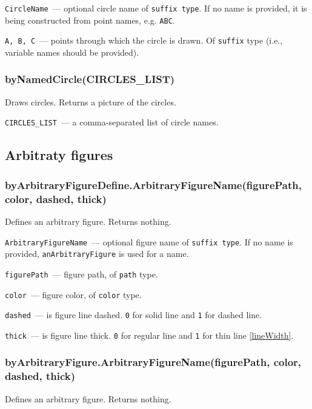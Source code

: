 	\texttt{CircleName}~— optional circle name of \texttt{suffix type}. If no name is provided, it is being constructed from point names, e.g. \texttt{ABC}.
	
	\texttt{A, B, C}~— points through which the circle is drawn. Of \texttt{suffix} type (i.e., variable names should be provided).


\subsubsection{byNamedCircle(CIRCLES\_LIST)}\label{byNamedCircle}
	
	Draws circles. Returns a picture of the circles.
	
	\texttt{CIRCLES\_LIST}~— a comma-separated list of circle names.

\subsection{Arbitraty figures}

\subsubsection{byArbitraryFigureDefine.ArbitraryFigureName(figurePath, color, dashed, thick)}\label{byArbitraryFigureDefine}
	
	Defines an arbitrary figure. Returns nothing.
	
	\texttt{ArbitraryFigureName}~— optional figure name of \texttt{suffix type}. If no name is provided, \texttt{anArbitraryFigure} is used for a name.
	
	\texttt{figurePath}~— figure path, of \texttt{path} type.
	
	\texttt{color}~— figure color, of \texttt{color} type.
	
	\texttt{dashed}~— is figure line dashed. \texttt{0} for solid line and \texttt{1} for dashed line.
	
	\texttt{thick}~— is figure line thick. \texttt{0} for regular line and \texttt{1} for thin line \ref{lineWidth}.

\subsubsection{byArbitraryFigure.ArbitraryFigureName(figurePath, color, dashed, thick)}\label{byArbitraryFigure}

	Defines an arbitrary figure. Returns nothing.
	

